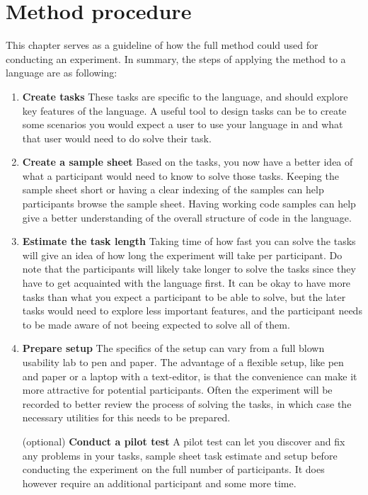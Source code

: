 \chapter{Method procedure}
\label{section:MethodSummary}
This chapter serves as a guideline of how the full method could used for conducting an experiment. In summary, the steps of applying the method to a language are as following:

\begin{enumerate}
\item \textbf{Create tasks} These tasks are specific to the language, and should explore key features of the language. A useful tool to design tasks can be to create some scenarios you would expect a user to use your language in and what that user would need to do solve their task.
\item \textbf{Create a sample sheet} Based on the tasks, you now have a better idea of what a participant would need to know to solve those tasks. Keeping the sample sheet short or having a clear indexing of the samples can help participants browse the sample sheet. Having working code samples can help give a better understanding of the overall structure of code in the language.
\item \textbf{Estimate the task length} Taking time of how fast you can solve the tasks will give an idea of how long the experiment will take per participant. Do note that the participants will likely take longer to solve the tasks since they have to get acquainted with the language first. It can be okay to have more tasks than what you expect a participant to be able to solve, but the later tasks would need to explore less important features, and the participant needs to be made aware of not beeing expected to solve all of them.
\item \textbf{Prepare setup} The specifics of the setup can vary from a full blown usability lab to pen and paper. The advantage of a flexible setup, like pen and paper or a laptop with a text-editor, is that the convenience can make it more attractive for potential participants. Often the experiment will be recorded to better review the process of solving the tasks, in which case the necessary utilities for this needs to be prepared.
\item[(optional)] \textbf{Conduct a pilot test} A pilot test can let you discover and fix any problems in your tasks, sample sheet task estimate and setup before conducting the experiment on the full number of participants. It does however require an additional participant and some more time.

\end{enumerate}
